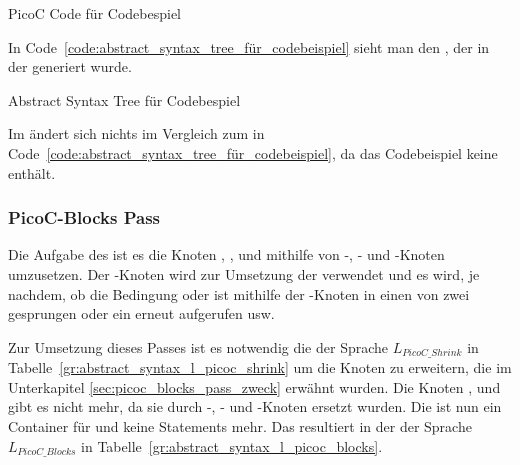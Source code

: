 \begin{code}
  \centering
  \caption{PicoC Code für Codebespiel}
  \label{code:picoc_code_für_codebeispiel}
\end{code}

In Code~\ref{code:abstract_syntax_tree_für_codebeispiel} sieht man den , der in der  generiert wurde.

\begin{code}
  \centering
  \caption{Abstract Syntax Tree für Codebespiel}
  \label{code:abstract_syntax_tree_für_codebeispiel}
\end{code}

Im  ändert sich nichts im Vergleich zum  in Code~\ref{code:abstract_syntax_tree_für_codebeispiel}, da das Codebeispiel keine  enthält.


\subsubsection{PicoC-Blocks Pass}
\label{picoc_blocks_pass}
\label{sec:picoc_blocks_pass_zweck}

Die Aufgabe des  ist es die Knoten , ,  und  mithilfe von -, - und -Knoten umzusetzen. Der -Knoten wird zur Umsetzung der  verwendet und es wird, je nachdem, ob die Bedingung  oder  ist mithilfe der -Knoten in einen von zwei  gesprungen oder ein  erneut aufgerufen usw.


Zur Umsetzung dieses Passes ist es notwendig die  der Sprache $L_{PicoC\_Shrink}$ in Tabelle~\ref{gr:abstract_syntax_l_picoc_shrink} um die Knoten zu erweitern, die im Unterkapitel \ref{sec:picoc_blocks_pass_zweck} erwähnt wurden. Die Knoten ,  und  gibt es nicht mehr, da sie durch -, - und -Knoten ersetzt wurden. Die   ist nun ein Container für   und keine Statements  mehr. Das resultiert in der  der Sprache $L_{PicoC\_Blocks}$ in Tabelle~\ref{gr:abstract_syntax_l_picoc_blocks}.

